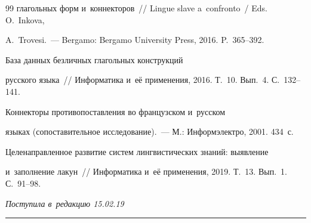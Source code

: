 {{\begin{thebibliography}{99}
глагольных форм и~коннекторов~/\!\!/ Lingue slave a~confronto~/ Eds. O.~Inkova,  


A.~Trovesi.~--- Bergamo: Bergamo University Press, 2016. P.~365--392.







 База данных безличных глагольных конструкций 


русского языка~/\!\!/ Информатика и~её применения, 2016. Т.~10. Вып.~4. С.~132--141.













 Коннекторы противопоставления во французском и~русском 


языках (сопоставительное исследование).~--- М.: Информэлектро, 2001. 434~с.




 Целенаправленное развитие систем лингвистических знаний: выявление 


и~заполнение лакун~/\!\!/ Информатика и~её применения, 2019. Т.~13. Вып.~1. С.~91--98.


        \end{thebibliography}


} }








\vspace*{-3pt}





\hfill{\small\textit{Поступила в~редакцию 15.02.19}}














\vspace*{8pt}





\hrule





\vspace*{2pt}





